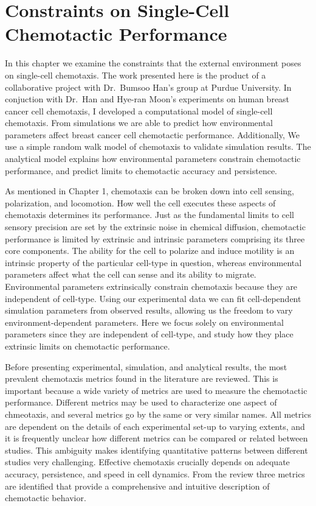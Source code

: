 
\chapter{Constraints on Single-Cell Chemotactic Performance}

\noindent
In this chapter we examine the constraints that the external environment poses on single-cell chemotaxis. The work presented here is the product of a collaborative project with Dr.\ Bumsoo Han's group at Purdue University. In conjuction with Dr.\ Han and Hye-ran Moon's experiments on human breast cancer cell chemotaxis, I developed a computational model of single-cell chemotaxis. From simulations we are able to predict how environmental parameters affect breast cancer cell chemotactic performance. Additionally, We use a simple random walk model of chemotaxis to validate simulation results. The analytical model explains how environmental parameters constrain chemotactic performance, and predict limits to chemotactic accuracy and persistence.

As mentioned in Chapter 1, chemotaxis can be broken down into cell sensing, polarization, and locomotion. How well the cell executes these aspects of chemotaxis determines its performance. Just as the fundamental limits to cell sensory precision are set by the extrinsic noise in chemical diffusion, chemotactic performance is limited by extrinsic and intrinsic parameters comprising its three core components. The ability for the cell to polarize and induce motility is an intrinsic property of the particular cell-type in question, whereas environmental parameters affect what the cell can sense and its ability to migrate. Environmental parameters extrinsically constrain chemotaxis because they are independent of cell-type. Using our experimental data we can fit cell-dependent simulation parameters from observed results, allowing us the freedom to vary environment-dependent parameters. Here we focus solely on environmental parameters since they are independent of cell-type, and study how they place extrinsic limits on chemotactic performance.

Before presenting experimental, simulation, and analytical results, the most prevalent chemotaxis metrics found in the literature are reviewed. This is important because a wide variety of metrics are used to measure the chemotactic performance. Different metrics may be used to characterize one aspect of chmeotaxis, and several metrics go by the same or very similar names. All metrics are dependent on the details of each experimental set-up to varying extents, and it is frequently unclear how different metrics can be compared or related between studies. This ambiguity makes identifying quantitative patterns between different studies very challenging. Effective chemotaxis crucially depends on adequate accuracy, persistence, and speed in cell dynamics. From the review three metrics are identified that provide a comprehensive and intuitive description of chemotactic behavior.

